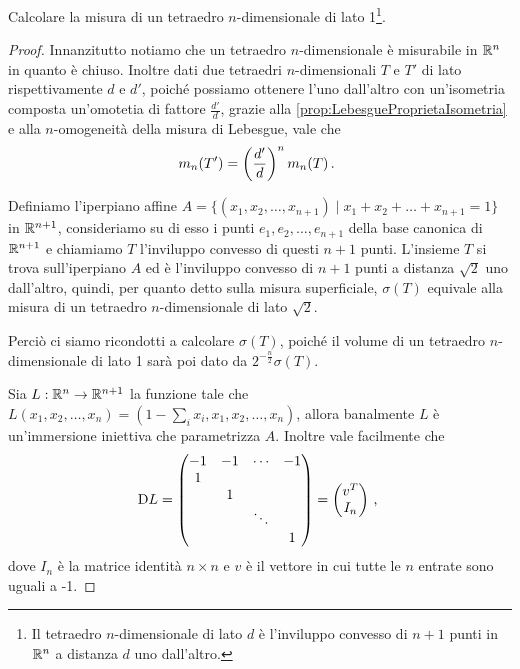 \begin{exercise}\label{es:MisuraTetraedro}
	Calcolare la misura di un tetraedro $n$-dimensionale di lato 1\footnote{Il tetraedro $n$-dimensionale di lato $d$ è l'inviluppo convesso di $n+1$ punti in $\mathbb R^n$ a distanza $d$ uno dall'altro.}.
\end{exercise}
\begin{proof}
	Innanzitutto notiamo che un tetraedro $n$-dimensionale è misurabile in $\mathbb R^n$ in quanto è chiuso.
	Inoltre  dati due tetraedri $n$-dimensionali $T$ e $T'$ di lato rispettivamente $d$ e $d'$, poiché possiamo ottenere l'uno dall'altro con un'isometria composta un'omotetia di fattore $\frac{d'}d$, grazie alla \cref{prop:LebesgueProprietaIsometria} e alla $n$-omogeneità della misura di Lebesgue, vale che 
	\begin{equation*} 
		m_n(T')=\left(\frac{d'}{d}\right)^nm_n(T)\, \text{. }
	\end{equation*}

	Definiamo l'iperpiano affine $A=\{(x_1,x_2,\ldots,x_{n+1}) \mid x_1+x_2+\ldots +x_{n+1}=1\}$ in $\mathbb R^{n+1}$, consideriamo su di esso i punti $e_1,e_2,\ldots,e_{n+1}$ della base canonica di $\mathbb R^{n+1}$ e chiamiamo $T$ l'inviluppo convesso di questi $n+1$ punti. 
	L'insieme $T$ si trova sull'iperpiano $A$ ed è l'inviluppo convesso di $n+1$ punti a distanza $\sqrt 2$ uno dall'altro, quindi, per quanto detto sulla misura superficiale, $\sigma(T)$ equivale alla misura di un tetraedro $n$-dimensionale di lato $\sqrt 2$. %

	Perciò ci siamo ricondotti a calcolare $\sigma(T)$, poiché il volume di un tetraedro $n$-dimensionale di lato 1 sarà poi dato da $2^{-\frac n2}\sigma(T)$.

	Sia $L:\mathbb R^n\to\mathbb R^{n+1}$ la funzione tale che $L(x_1,x_2,\ldots,x_n)=(1-\sum_ix_i,x_1,x_2,\ldots,x_n)$, allora banalmente $L$ è un'immersione iniettiva che parametrizza $A$. Inoltre vale facilmente che 
	\begin{equation*}
		\mathrm D L=\begin{pmatrix}
		        	-1	& -1 & \cdots & -1\\
					1 & & & \\
					 & 1 & & \\
					 & &\ddots& \\
					 & & & 1
		        \end{pmatrix}=
		        \begin{pmatrix}
		        	v^T\\
		        	I_n
		        \end{pmatrix}\, \text{, }
	\end{equation*}
	dove $I_n$ è la matrice identità $n\times n$ e $v$ è il vettore in cui tutte le $n$ entrate sono uguali a -1.
	

\end{proof}
